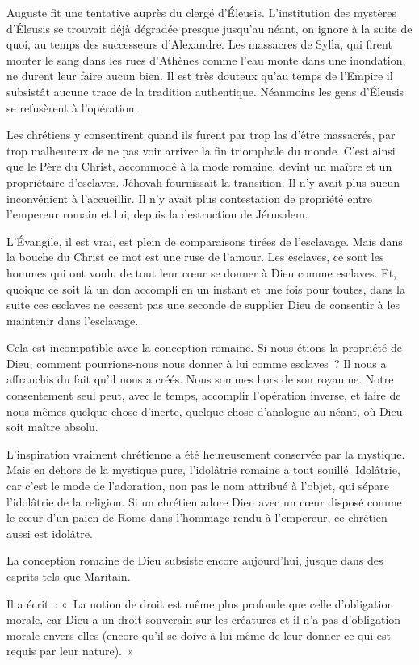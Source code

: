 \documentclass[french,twoside]{book} %
\begin{document}
Auguste fit une tentative auprès du clergé d'Éleusis. L'institution des mystères d'Éleusis se trouvait déjà dégradée presque jusqu'au néant, on ignore à la suite de quoi, au temps des successeurs d'Alexandre. Les massacres de Sylla, qui firent monter le sang dans les rues d'Athènes comme l'eau monte dans une inondation, ne durent leur faire aucun bien. Il est très douteux qu'au temps de l'Empire il subsistât aucune trace de la tradition authentique. Néanmoins les gens d'Éleusis se refusèrent à l'opération.\par
Les chrétiens y consentirent quand ils furent par trop las d'être massacrés, par trop malheureux de ne pas voir arriver la fin triomphale du monde. C'est ainsi que le Père du Christ, accommodé à la mode romaine, devint un maître et un propriétaire d'esclaves. Jéhovah fournissait la transition. Il n'y avait plus aucun inconvénient à l'accueillir. Il n'y avait plus contestation de propriété entre l'empereur romain et lui, depuis la destruction de Jérusalem.\par
L'Évangile, il est vrai, est plein de comparaisons tirées de l'esclavage. Mais dans la bouche du Christ ce mot est une ruse de l'amour. Les esclaves, ce sont les hommes qui ont voulu de tout leur cœur se donner à Dieu comme esclaves. Et, quoique ce soit là un don accompli en un instant et une fois pour toutes, dans la suite ces esclaves ne cessent pas une seconde de supplier Dieu de consentir à les maintenir dans l'esclavage.\par
Cela est incompatible avec la conception romaine. Si nous étions la propriété de Dieu, comment pourrions-nous nous donner à lui comme esclaves ? Il nous a affranchis du fait qu'il nous a créés. Nous sommes hors de son royaume. Notre consentement seul peut, avec le temps, accomplir l'opération inverse, et faire de nous-mêmes quelque chose d'inerte, quelque chose d'analogue au néant, où Dieu soit maître absolu.\par
L'inspiration vraiment chrétienne a été heureusement conservée par la mystique. Mais en dehors de la mystique pure, l'idolâtrie romaine a tout souillé. Idolâtrie, car c'est le mode de l'adoration, non pas le nom attribué à l'objet, qui sépare l'idolâtrie de la religion. Si un chrétien adore Dieu avec un cœur disposé comme le cœur d'un païen de Rome dans l'hommage rendu à l'empereur, ce chrétien aussi est idolâtre.\par
La conception romaine de Dieu subsiste encore aujourd'hui, jusque dans des esprits tels que Maritain.\par
Il a écrit : « La notion de droit est même plus profonde que celle d'obligation morale, car Dieu a un droit souverain sur les créatures et il n'a pas d'obligation morale envers elles (encore qu'il se doive à lui-même de leur donner ce qui est requis par leur nature). »\par
\end{document}
